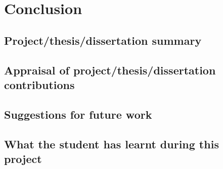 %
%


\chapter{Conclusion}
\vspace{-2em}
\minitoc



\blindtext

\section{Project/thesis/dissertation summary}

\blindtext

\blindtext

\section{Appraisal of project/thesis/dissertation contributions}

\blindtext

\section{Suggestions for future work}

\blindtext

\section{What the student has learnt during this project}		%

\blindtext